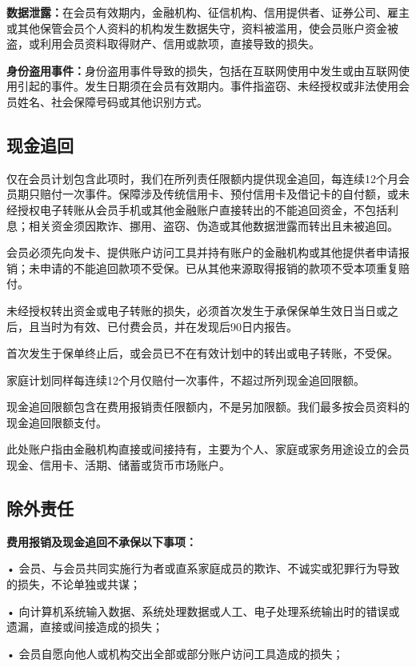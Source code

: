\documentclass[UTF8,fontset=none,11pt,a4paper]{ctexart}
\begin{document}
\textbf{数据泄露：}在会员有效期内，金融机构、征信机构、信用提供者、证券公司、雇主或其他保管会员个人资料的机构发生数据失守，资料被滥用，使会员账户资金被盗，或利用会员资料取得财产、信用或款项，直接导\allowbreak\mbox{致的损失。}


\textbf{身份盗用事件：}身份盗用事件导致的损失，包括在互联网使用中发生或由互联网使用引起的事件。发生日期须在会员有效期内。事件指盗窃、未经授权或非法使用会员姓名、社会保障号码或其他\allowbreak\mbox{识别方式。}


\subsection*{现金追回}
仅在会员计划包含此项时，我们在所列责任限额内提供现金追回，每连续12个月会员期只赔付一次事件。保障涉及传统信用卡、预付信用卡及借记卡的自付额，或未经授权电子转账从会员手机或其他金融账户直接转出的不能追回资金，不包括利息；相关资金须因欺诈、挪用、盗窃、伪造或其他数据泄露而转出且\allowbreak\mbox{未被追回。}


会员必须先向发卡、提供账户访问工具并持有账户的金融机构或其他提供者申请报销；未申请的不能追回款项不受保。已从其他来源取得报销的款项不受本项重\allowbreak\mbox{复赔付。}


未经授权转出资金或电子转账的损失，必须首次发生于承保保单生效日当日或之后，且当时为有效、已付费会员，并在发现后90\allowbreak\mbox{日内报告。}


首次发生于保单终止后，或会员已不在有效计划中的转出或电子转账，不受保。


家庭计划同样每连续12个月仅赔付一次事件，不超过所列现金\allowbreak\mbox{追回限额。}


现金追回限额包含在费用报销责任限额内，不是另加限额。我们最多按会员资料的现金追回\allowbreak\mbox{限额支付。}


此处账户指由金融机构直接或间接持有，主要为个人、家庭或家务用途设立的会员现金、信用卡、活期、储蓄或货币\allowbreak\mbox{市场账户。}


\subsection*{除外责任}
\textbf{费用报销及现金追回不承保以下事项：}


• 会员、与会员共同实施行为者或直系家庭成员的欺诈、不诚实或犯罪行为导致的损失，不论单\allowbreak\mbox{独或共谋；}


• 向计算机系统输入数据、系统处理数据或人工、电子处理系统输出时的错误或遗漏，直接或间接造\allowbreak\mbox{成的损失；}


• 会员自愿向他人或机构交出全部或部分账户访问工具造成\allowbreak\mbox{的损失；}
\end{document}
